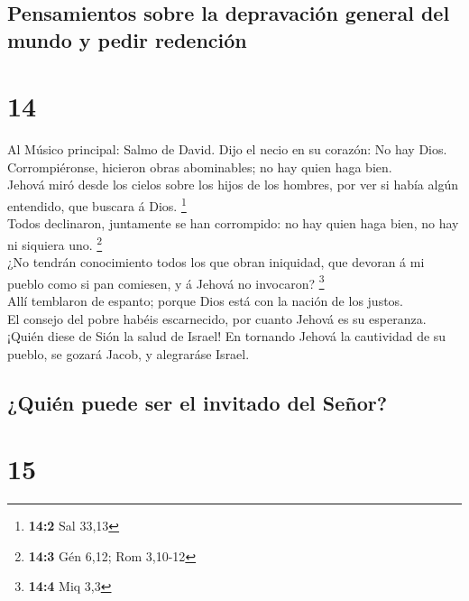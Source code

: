 \hypertarget{pensamientos-sobre-la-depravaciuxf3n-general-del-mundo-y-pedir-redenciuxf3n}{%
\subsection{Pensamientos sobre la depravación general del mundo y pedir
redención}\label{pensamientos-sobre-la-depravaciuxf3n-general-del-mundo-y-pedir-redenciuxf3n}}

\hypertarget{section-13}{%
\section{14}\label{section-13}}

 Al Músico principal: Salmo de David. Dijo el necio en su
corazón: No hay Dios. Corrompiéronse, hicieron obras abominables; no hay
quien haga bien.\\
 Jehová miró desde los cielos sobre los hijos de los
hombres, por ver si había algún entendido, que buscara á Dios.
\footnote{\textbf{14:2} Sal 33,13}\\
 Todos declinaron, juntamente se han corrompido: no hay
quien haga bien, no hay ni siquiera uno. \footnote{\textbf{14:3} Gén
  6,12; Rom 3,10-12}\\
 ¿No tendrán conocimiento todos los que obran iniquidad, que
devoran á mi pueblo como si pan comiesen, y á Jehová no invocaron?
\footnote{\textbf{14:4} Miq 3,3}\\
 Allí temblaron de espanto; porque Dios está con la nación
de los justos.\\
 El consejo del pobre habéis escarnecido, por cuanto Jehová
es su esperanza.\\
 ¡Quién diese de Sión la salud de Israel! En tornando Jehová
la cautividad de su pueblo, se gozará Jacob, y alegraráse Israel.

\hypertarget{quiuxe9n-puede-ser-el-invitado-del-seuxf1or}{%
\subsection{¿Quién puede ser el invitado del
Señor?}\label{quiuxe9n-puede-ser-el-invitado-del-seuxf1or}}

\hypertarget{section-14}{%
\section{15}\label{section-14}}

